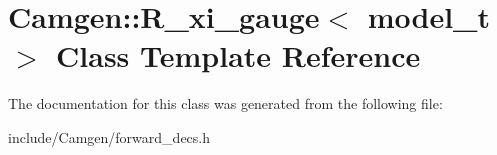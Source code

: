 \hypertarget{a00456}{\section{Camgen\-:\-:R\-\_\-xi\-\_\-gauge$<$ model\-\_\-t $>$ Class Template Reference}
\label{a00456}
}


The documentation for this class was generated from the following file\-:\begin{DoxyCompactItemize}
\item 
include/\-Camgen/forward\-\_\-decs.\-h\end{DoxyCompactItemize}

